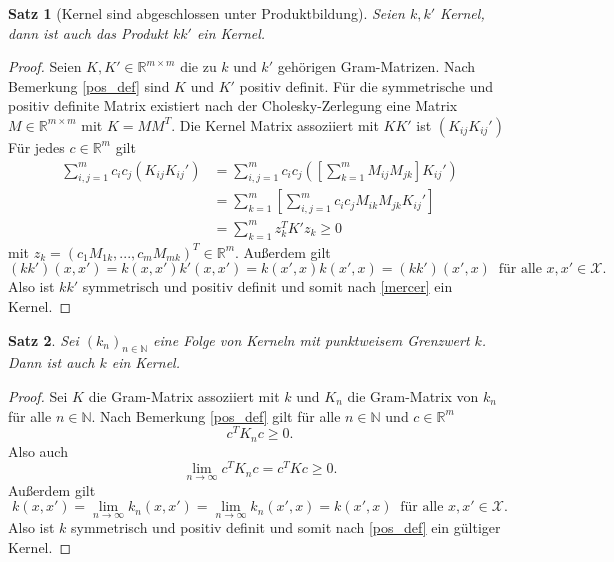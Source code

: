 \documentclass{article}
\theoremstyle{plain}
\newtheorem{thm}{Satz}[subsection]
\theoremstyle{definition}
\begin{document}
    
    \begin{thm}[Kernel sind abgeschlossen unter Produktbildung] \label{kernel_product}
        Seien $k, k'$ Kernel, dann ist auch das Produkt $k k'$ ein Kernel.
    \end{thm}
    \begin{proof}
        Seien $K, K' \in \mathbb{R}^{m \times m}$ die zu $k$ und $k'$ gehörigen Gram-Matrizen. Nach Bemerkung \ref{pos_def} sind $K$ und $K'$ positiv definit. Für die symmetrische und positiv definite Matrix existiert nach der Cholesky-Zerlegung eine Matrix $M \in \mathbb{R}^{m \times m}$ mit $K = M M^{T}$. Die Kernel Matrix assoziiert mit $K K'$ ist $(K_{ij} K_{ij}')$ Für jedes $c \in \mathbb{R}^{m}$ gilt
        \[
            \begin{split}
            \sum_{i,j = 1}^{m} c_{i} c_{j} (K_{ij} K_{ij}')
            &=
            \sum_{i,j = 1}^{m} c_{i} c_{j} ([\sum_{k = 1}^{m} M_{ij} M_{jk}] K_{ij}') \\
            &=
            \sum_{k = 1}^{m}[\sum_{i,j = 1}^{m} c_{i} c_{j} M_{ik} M_{jk} K_{ij}'] \\
            &=
            \sum_{k = 1}^{m}z_{k}^{T} K' z_{k}
            \geq
            0
            \end{split}
        \]
        mit $z_k = (c_{1}M_{1k},...,c_{m}M_{mk})^{T} \in \mathbb{R}^{m}$. Außerdem gilt
        \[
            (kk')(x,x')
            =
            k(x, x') k'(x,x')
            =
            k(x', x) k(x', x)
            =
            (k k')(x',x)
            \ \text{ für alle $x,x' \in \mathcal{X}$}.
        \]
        Also ist $k k'$ symmetrisch und positiv definit und somit nach \ref{mercer} ein Kernel.
    \end{proof}
    
    \begin{thm} \label{kernel_limit}
        Sei $(k_{n})_{n \in \mathbb{N}}$ eine Folge von Kerneln mit punktweisem Grenzwert $k$. Dann ist auch $k$ ein Kernel. 
    \end{thm}
    \begin{proof}
        Sei $K$ die Gram-Matrix assoziiert mit $k$ und $K_{n}$ die Gram-Matrix von $k_{n}$ für alle $n \in \mathbb{N}$. Nach Bemerkung \ref{pos_def} gilt für alle $n \in \mathbb{N}$ und $c \in \mathbb{R}^{m}$
        \[
            c^{T} K_{n} c \geq 0.
        \]
        Also auch
        \[
            \lim_{n \to \infty} c^{T} K_{n} c = c^{T} K c \geq 0.
        \]
        Außerdem gilt
        \[
            k(x,x')
            =
            \lim_{n \to \infty} k_{n}(x, x')
            =
            \lim_{n \to \infty} k_{n}(x',x)
            =
            k(x',x)
            \ \text{ für alle $x,x' \in \mathcal{X}$}.
        \]
        Also ist $k$ symmetrisch und positiv definit und somit nach \ref{pos_def} ein gültiger Kernel.
    \end{proof}
    
\end{document}
